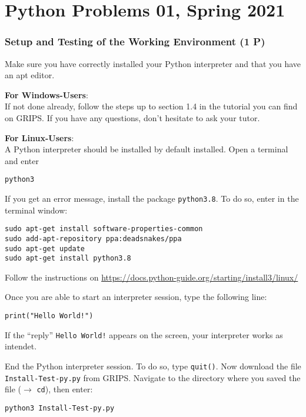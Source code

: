 \documentclass[
	english,
	fontsize=10pt,
	parskip=half,
	titlepage=true,
	DIV=12
]{scrartcl}
\begin{document}
\part*{Python Problems 01, Spring 2021}

\section{Setup and Testing of the Working Environment (1 P)}
Make sure you have correctly installed your Python interpreter and that you have an apt editor.

\textbf{For Windows-Users}:\\
If not done already, follow the steps up to section 1.4 in the tutorial you can find on GRIPS. If you have any questions, don't hesitate to ask your tutor.

\textbf{For Linux-Users}:\\
A Python interpreter should be installed by default installed. Open a terminal and enter
\begin{center}
	\texttt{python3}
\end{center}
If you get an error message, install the package \texttt{python3.8}. To do so, enter in the terminal window:
\begin{center}
	\texttt{sudo apt-get install software-properties-common}\\
	\texttt{sudo add-apt-repository ppa:deadsnakes/ppa}\\
	\texttt{sudo apt-get update}\\
	\texttt{sudo apt-get install python3.8}
\end{center}

Follow the instructions on \url{https://docs.python-guide.org/starting/install3/linux/}

Once you are able to start an interpreter session, type the following line:
\begin{center}
	\texttt{print("Hello World!")}
\end{center}
If the \enquote{reply} \texttt{Hello World!} appears on the screen, your interpreter works as intendet.

End the Python interpreter session. To do so, type \texttt{quit()}. Now download the file  \texttt{Install-Test-py.py} from GRIPS. Navigate to the directory where you saved the file ($\rightarrow$ \texttt{cd}), then enter:
\begin{center}
	\texttt{python3 Install-Test-py.py}
\end{center}
\end{document}
